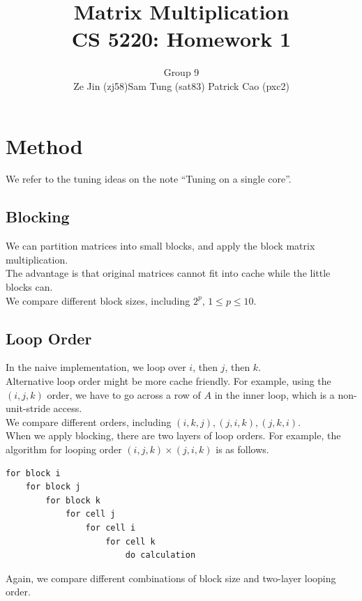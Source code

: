 \documentclass[12pt]{article}
\numberwithin{equation}{section}
\begin{document}
\title{\bf{Matrix Multiplication \\ CS 5220: Homework 1}}

\author{Group 9 \\ Ze Jin (zj58)\quad Sam Tung (sat83) \quad Patrick Cao (pxc2) \\}

\date{ }

\maketitle





\section{Method}

We refer to the tuning ideas on the note ``Tuning on a single core''.

\subsection{Blocking}

We can partition matrices into small blocks, and apply the block matrix multiplication.
\\
The advantage is that original matrices cannot fit into cache while the little blocks can.
\\
We compare different block sizes, including $2^p$, $1 \leq p \leq 10$.

\subsection{Loop Order}

In the naive implementation, we loop over $i$, then $j$, then $k$.
\\
Alternative loop order might be more cache friendly. For example, using the $(i, j, k)$ order, we have to go across a row of $A$ in the inner loop, which is a non-unit-stride access.
\\
We compare different orders, including $(i, k, j), (j, i, k), (j, k, i)$.
\\
When we apply blocking, there are two layers of loop orders. For example, the algorithm for looping order $(i, j, k)\times(j, i, k)$ is as follows.
\begin{verbatim}
for block i
    for block j
        for block k
            for cell j
                for cell i
                    for cell k
                        do calculation
\end{verbatim}
Again, we compare different combinations of block size and two-layer looping order.
\end{document}
